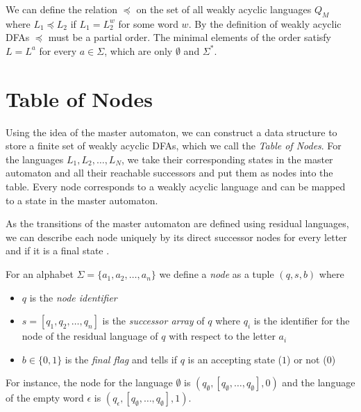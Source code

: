\par

We can define the relation $\preceq$ on the set of all weakly acyclic languages $Q_{M}$ where $L_{1} \preceq L_{2}$ if $L_{1} = L_{2}^{w}$ for some word $w$. By the definition of weakly acyclic DFAs $\preceq$ must be a partial order. The minimal elements of the order satisfy $L = L^{a}$ for every $a \in \Sigma$, which are only $\emptyset$ and $\Sigma^{*}$.



\section{Table of Nodes}
Using the idea of the master automaton, we can construct a data structure to store a finite set of weakly acyclic DFAs, which we call the \textit{Table of Nodes}. For the languages $L_{1},L_{2},\dots,L_{N}$, we take their corresponding states in the master automaton and all their reachable successors and put them as nodes into the table. Every node corresponds to a weakly acyclic language and can be mapped to a state in the master automaton.

\par 

As the transitions of the master automaton are defined using residual languages, we can describe each node uniquely by its direct successor nodes for every letter and if it is a final state \cite{blondin_24}.

\par

For an alphabet $\Sigma = \{a_{1}, a_{2},\dots,a_{n} \}$ we define a \emph{node} as a tuple $(q,s,b)$ where
\begin{itemize}[--,noitemsep]
\item $q$ is the \emph{node identifier}
\item $s = [q_{1},q_{2},\dots,q_{n}]$ is the \emph{successor array} of $q$ where $q_{i}$ is the identifier for the node of the residual language of $q$ with respect to the letter $a_{i}$
\item $b \in \{0,1\}$ is the \emph{final flag} and tells if $q$ is an accepting state ($1$) or not ($0$)
\end{itemize}
For instance, the node for the language $\emptyset$ is $(q_{\emptyset},[q_{\emptyset},\dots,q_{\emptyset}],0)$ and the language of the empty word $\epsilon$ is $(q_{\epsilon},[q_{\emptyset},\dots,q_{\emptyset}],1)$.

